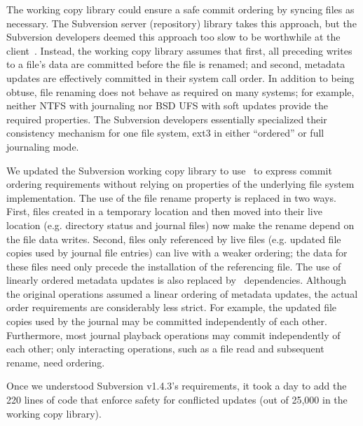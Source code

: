 The working copy library could ensure a safe commit ordering by
syncing files as necessary. The Subversion server (repository) library
takes this approach, but
%
the Subversion
developers deemed this approach too slow to be worthwhile at the
client~\cite{svntradeoff}.
%
Instead, the working copy library assumes that
%
first, all preceding writes to a file's data are committed before the file
is renamed;
%
and second, metadata updates are effectively committed in their system call
order.
%
%
In addition to being obtuse, file renaming does not behave as required on
many systems; for example, neither NTFS with journaling nor BSD UFS with
soft updates provide the required properties.  The Subversion developers
essentially specialized their consistency mechanism for one file system,
ext3 in either ``ordered'' or full journaling mode.
%

We updated the Subversion working copy library to use \patchgroups\ to
express commit ordering requirements
without relying on properties of the
underlying file system implementation.
%
The use of the file rename property is replaced in two ways.
%
First, files created in a temporary location and then moved into their
live location (e.g. directory status and journal files) now
make the rename depend on the file data writes.
%
Second, files only referenced by live files (e.g. updated file
copies used by journal file entries) can live with a weaker ordering;
the data for these files need only precede the installation of the
referencing file.
%
The use of linearly ordered metadata updates is also replaced by
\patchgroup\ dependencies.
%
Although the original operations assumed a linear ordering of metadata
updates, the actual order requirements are considerably less strict.
%
For example, the updated file copies used by the journal may be
committed independently of each other.
%
Furthermore, most journal playback operations may commit
independently of each other; only interacting operations, such as a
file read and subsequent rename, need ordering.

Once we understood Subversion v1.4.3's requirements, it took a day to add
the 220 lines of code that enforce safety for conflicted updates (out of
25,000 in the working copy library).

